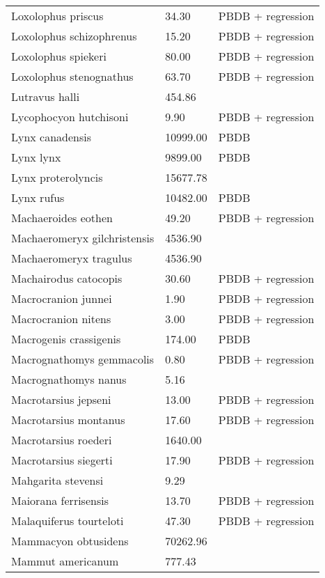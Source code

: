 \begin{longtable}{p{} p{} p{}}
    Loxolophus priscus & 34.30 & PBDB + regression \\ 
    Loxolophus schizophrenus & 15.20 & PBDB + regression \\ 
    Loxolophus spiekeri & 80.00 & PBDB + regression \\ 
    Loxolophus stenognathus & 63.70 & PBDB + regression \\ 
    Lutravus halli & 454.86 & \cite{Tomiya2013} \\ 
    Lycophocyon hutchisoni & 9.90 & PBDB + regression \\ 
    Lynx canadensis & 10999.00 & PBDB \\ 
    Lynx lynx & 9899.00 & PBDB \\ 
    Lynx proterolyncis & 15677.78 & \cite{Tomiya2013} \\ 
    Lynx rufus & 10482.00 & PBDB \\ 
    Machaeroides eothen & 49.20 & PBDB + regression \\ 
    Machaeromeryx gilchristensis & 4536.90 & \cite{Tomiya2013} \\ 
    Machaeromeryx tragulus & 4536.90 & \cite{Tomiya2013} \\ 
    Machairodus catocopis & 30.60 & PBDB + regression \\ 
    Macrocranion junnei & 1.90 & PBDB + regression \\ 
    Macrocranion nitens & 3.00 & PBDB + regression \\ 
    Macrogenis crassigenis & 174.00 & PBDB \\ 
    Macrognathomys gemmacolis & 0.80 & PBDB + regression \\ 
    Macrognathomys nanus & 5.16 & \cite{Tomiya2013} \\ 
    Macrotarsius jepseni & 13.00 & PBDB + regression \\ 
    Macrotarsius montanus & 17.60 & PBDB + regression \\ 
    Macrotarsius roederi & 1640.00 & \cite{Soligo2006} \\ 
    Macrotarsius siegerti & 17.90 & PBDB + regression \\ 
    Mahgarita stevensi & 9.29 & \cite{Worthman1893} \\ 
    Maiorana ferrisensis & 13.70 & PBDB + regression \\ 
    Malaquiferus tourteloti & 47.30 & PBDB + regression \\ 
    Mammacyon obtusidens & 70262.96 & \cite{Tomiya2013} \\ 
    Mammut americanum & 777.43 & \cite{Smith2004} \\ 

\end{longtable}
